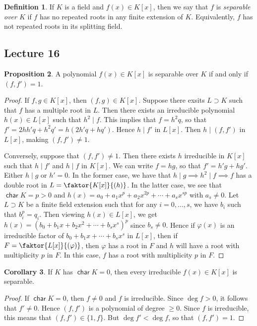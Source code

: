 \documentclass[10pt,letterpaper,cm]{nupset}
\theoremstyle{definition}
\newtheorem{definition}{Definition}[subsection]
\theoremstyle{theorem}
\newtheorem{prop}[definition]{Proposition}
\newtheorem{corollary}[definition]{Corollary}
\theoremstyle{remark}
\newcommand{\1}{\mathbf{1}}
\newcommand{\0}{\vec 0}
\DeclareMathOperator{\Char}{\mathsf{char}}
\begin{document}
\begin{definition}
If $K$ is a field and $f(x) \in K[x]$, then we say that $f$ is \textit{separable over $K$} if $f$ has no repeated roots in any finite extension of $K$. Equivalently, $f$ has not repeated roots in its splitting field.
\end{definition}

\subsection{Lecture 16}

\begin{prop}
A polynomial $f(x) \in K[x]$ is separable over $K$ if and only if $(f, f') =1$.
\end{prop}
\begin{proof}
If $f,g \in K[x]$, then $(f,g) \in K[x]$. Suppose there exsits $L \supset K$ such that $f$ has a multiple root in $L$. Then there exists an irreducible polynomial $h(x) \in L[x]$ such that $h^2 \mid f$. This implies that $f = h^2q$, so that $f' = 2hh'q +h^2q' = h(2h'q+hq')$. Hence $h \mid f'$ in $L[x]$. Then $h \mid (f,f')$ in $L[x]$, making $(f,f') \ne 1$.

\medskip

 
Conversely, suppose that $(f,f') \ne 1$. Then there exists $h$ irreducible in $K[x]$ such that $h\mid f'$ and $h \mid f$ in $K[x]$. We can write $f=hg$, so that $f' = h'g + hg'$. Either $h \mid g$ or $h'=0$. In the former case, we have that $h \mid g \implies h^2 \mid f \implies f$ has a double root in $L = \faktor{K[x]}{(h)}$. In the latter case, we see that $\Char{K} = p>0$ and $h(x) = a_0 + a_1x^p + a_2x^{2p} + \cdots + a_sx^{sp}$ with $a_s \ne 0$. Let $L \supset K$ be a finite field extension such that for any $i=0, \ldots, s$, we have $b_i$ such that $b_i^p = q_i$. Then viewing $h(x) \in L[x]$, we get $h(x) = (b_0 + b_1x + b_2x^2 + \cdots + b_sx^s)^p$ since $b_s \ne 0$. Hence if $\varphi(x)$ is an irreducible factor of $b_0 + b_1x + \cdots + b_sx^s$ in $L[x]$, then if $F = \faktor{L[x]}{(\varphi)}$, then $\varphi$ has a root in $F$ and $h$ will have a root with multiplicity $p$ in $F$. In this case, $f$ has a root with multiplicity $p$ in $F$.
\end{proof}

\begin{corollary}
If $K$ has $\Char{K} =0$, then every irreducible $f(x) \in K[x]$ is separable. 
\end{corollary}
\begin{proof}
If $\Char{K}=0$, then $f \ne 0$ and $f$ is irreducible. Since $\deg{f} >0$, it follows that $f' \ne 0$. Hence $(f,f')$ is a polynomial of degree $\geq 0$. Since $f$ is irreducible, this means that $(f,f') \in \{1, f\}$. But $\deg{f'} < \deg{f}$, so that $(f,f') =1$.
\end{proof}
\end{document}
